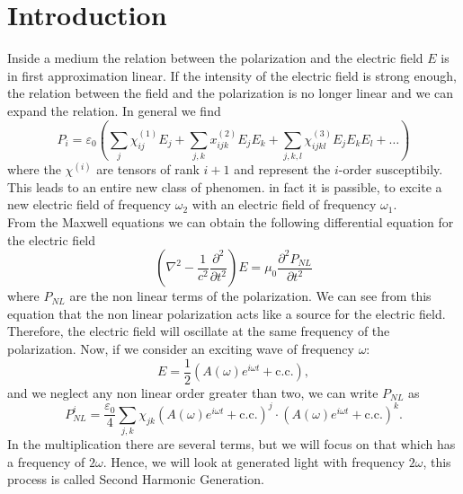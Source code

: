 \documentclass[a4paper,10pt]{article}
\begin{document}
\section{Introduction}
Inside a medium the relation between the polarization and the electric field $E$ is in first approximation linear. If the intensity of the electric field is strong enough, the relation between the field and the polarization is no longer linear and we can expand the relation. In general we find
\begin{equation}P_i  = \varepsilon_0\left(\sum_j \chi_{ij}^{(1)} E_j + \sum_{j,k}x_{ijk}^{(2)}E_jE_k + \sum_{j,k,l}\chi_{ijkl}^{(3)}E_jE_kE_l + \dots \right)\end{equation}
where the $\chi^{(i)}$ are tensors of rank $i+1$ and represent the $i$-order susceptibily. This leads to an entire new class of phenomen. in fact it is passible, to excite a new electric field of frequency $\omega_2$ with an electric field of frequency $\omega_1$.\\
From the Maxwell equations we can obtain \cite{saleh} the following differential equation for the electric field
\begin{equation}\left(\nabla^2 - \frac{1}{c^2}\frac{\partial^2}{\partial t^2}\right)E = \mu_0\frac{\partial^2 P_{NL}}{\partial t^2}\end{equation}
where $P_{NL}$ are the non linear terms of the polarization. We can see from this equation that the non linear polarization acts like a source for the electric field. Therefore, the electric field will oscillate at the same frequency of the polarization. Now, if we consider an exciting wave of frequency $\omega$:
\[E = \frac{1}{2}(A(\omega)e^{i\omega t} + \text{c.c.}), \]
and we neglect any non linear order greater than two, we can write $P_{NL}$ as
\[P_{NL}^i= \frac{\varepsilon_0}{4}\sum_{j,k}\chi_{jk}(A(\omega)e^{i\omega t} + \text{c.c.})^j\cdot (A(\omega)e^{i\omega t} + \text{c.c.})^k.\]
In the multiplication there are several terms, but we will focus on that which has a frequency of $2\omega$. Hence, we will look at generated light with frequency $2\omega$, this process is called Second Harmonic Generation.
\end{document}
